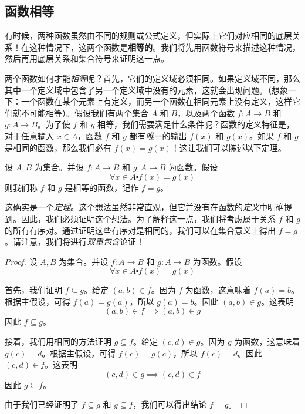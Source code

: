 
\subsection{函数相等}

有时候，两种函数虽然由不同的规则或公式定义，但实际上它们对应相同的底层关系！在这种情况下，这两个函数是\textbf{相等的}。我们将先用函数符号来描述这种情况，然后再用底层关系和集合符号来证明这一点。

两个函数如何才能\emph{相等}呢？首先，它们的定义域必须相同。如果定义域不同，那么其中一个定义域中包含了另一个定义域中没有的元素，这就会出现问题。（想象一下：一个函数在某个元素上有定义，而另一个函数在相同元素上没有定义，这样它们就不可能相等）。假设我们有两个集合 $A$ 和 $B$，以及两个函数 $f : A \to B$ 和 $g : A \to B$。为了使 $f$ 和 $g$ 相等，我们需要满足什么条件呢？函数的定义特征是，对于任意输入 $x \in A$，函数 $f$ 和 $g$ 都有\emph{唯一}的输出 $f(x)$ 和 $g(x)$。如果 $f$ 和 $g$ 是相同的函数，那么我们必有 $f(x) = g(x)$！这让我们可以陈述以下定理。

\begin{theorem}
    设 $A, B$ 为集合。并设 $f : A \to B$ 和 $g : A \to B$ 为函数。假设
    \[\forall x \in A \centerdot f(x) = g(x)\]
    则我们称 $f$ 和 $g$ 是相等的函数，记作 $f = g$。
\end{theorem}

这确实是一个\emph{定理}。这个想法虽然非常直观，但它并没有在函数的\emph{定义}中明确提到。因此，我们必须证明这个想法。为了解释这一点，我们将考虑属于关系 $f$ 和 $g$ 的所有有序对。通过证明这些有序对是相同的，我们可以在集合意义上得出 $f = g$。请注意，我们将进行\emph{双重包含}论证！

\begin{proof}
    设 $A, B$ 为集合。并设 $f : A \to B$ 和 $g : A \to B$ 为函数。假设
    \[\forall x \in A \centerdot f(x) = g(x)\]

    首先，我们证明 $f \subseteq g$。给定 $(a,b) \in f$。因为 $f$ 为函数，这意味着 $f(a) = b$。根据主假设，可得 $f(a) = g(a)$，所以 $g(a) = b$。因此 $(a,b) \in g$。这表明
    \[(a, b) \in f \implies (a, b) \in g\]
    因此 $f \subseteq g$。

    接着，我们用相同的方法证明 $g \subseteq f$。给定 $(c,d) \in g$。因为 $g$ 为函数，这意味着 $g(c) = d$。根据主假设，可得 $f(c) = g(c)$，所以 $f(c) = d$。因此 $(c,d) \in f$。这表明
    \[(c, d) \in g \implies (c, d) \in f\]
    因此 $g \subseteq f$。

    由于我们已经证明了 $f \subseteq g$ 和 $g \subseteq f$，我们可以得出结论 $f = g$。
\end{proof}


